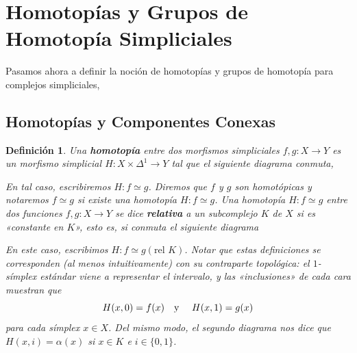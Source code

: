 \documentclass[11pt]{report}
\theoremstyle{colored}
\newtheorem{definition}{Definición}[section]
\renewcommand{\ss}[1]{\Delta^{#1}}
\newcommand{\guill}[1]{«#1»}
\begin{document}
\section{Homotopías y Grupos de Homotopía Simpliciales}

Pasamos ahora a definir la noción de homotopías y grupos de homotopía para complejos simpliciales,

\subsection{Homotopías y Componentes Conexas}

\begin{definition} Una \textbf{homotopía} entre dos morfismos simpliciales $f,g : X \to Y$ es un morfismo simplicial $H : X \times \ss{1} \to Y$ tal que el siguiente diagrama conmuta,
\begin{center}
\end{center}
En tal caso, escribiremos $H : f \simeq g$. Diremos que $f$ y $g$ son homotópicas y notaremos $f \simeq g$ si existe una homotopía $H: f \simeq g$. Una homotopía $H : f \simeq g$ entre dos funciones $f,g : X \to Y$ se dice \textbf{relativa} a un subcomplejo $K$ de $X$ si es \guill{constante en $K$}, esto es, si conmuta el siguiente diagrama
\begin{center}
\end{center}
En este caso, escribimos $H : f \simeq g (\text{rel $K$})$. Notar que estas definiciones se corresponden (al menos intuitivamente) con su contraparte topológica: el $1$-símplex estándar viene a representar el intervalo, y las \guill{inclusiones} de cada cara muestran que 
\[
H(x,0) = f(x) \text{\quad y \quad} H(x,1) = g(x)
\]
para cada símplex $x \in X$. Del mismo modo, el segundo diagrama nos dice que $H(x,i) = \alpha(x)$ si $x \in K$ e $i \in \{0,1\}$. 
\end{definition}
\end{document}
